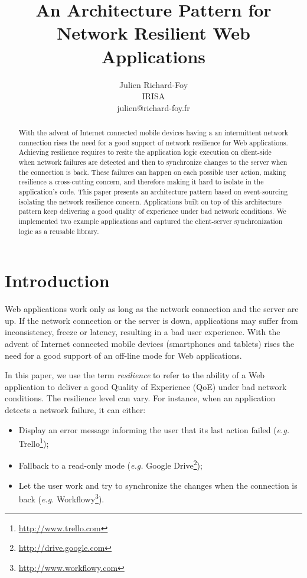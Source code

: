 \documentclass{article}
\begin{document}
\title{An Architecture Pattern for Network Resilient Web Applications}

\author{Julien Richard-Foy\\IRISA\\julien@richard-foy.fr}

\maketitle

\begin{abstract}
With the advent of Internet connected mobile devices having a an intermittent network connection rises the need for a good support of network resilience for Web applications. Achieving resilience requires to resite the application logic execution on client-side when network failures are detected and then to synchronize changes to the server when the connection is back. These failures can happen on each possible user action, making resilience a cross-cutting concern, and therefore making it hard to isolate in the application's code. This paper presents an architecture pattern based on event-sourcing isolating the network resilience concern. Applications built on top of this architecture pattern keep delivering a good quality of experience under bad network conditions. We implemented two example applications and captured the client-server synchronization logic as a reusable library.
\end{abstract}

\section{Introduction}

Web applications work only as long as the network connection and the server are up. If the network connection or the server is down, applications may suffer from inconsistency, freeze or latency, resulting in a bad user experience. With the advent of Internet connected mobile devices (smartphones and tablets) rises the need for a good support of an off-line mode for Web applications.

In this paper, we use the term \textit{resilience} to refer to the ability of a Web application to deliver a good Quality of Experience (QoE) under bad network conditions. The resilience level can vary. For instance, when an application detects a network failure, it can either:

\begin{itemize}
 \item Display an error message informing the user that its last action failed (\textit{e.g.} Trello\footnote{\href{http://www.trello.com}{http://www.trello.com}});
 \item Fallback to a read-only mode (\textit{e.g.} Google Drive\footnote{\href{http://drive.google.com}{http://drive.google.com}});
 \item Let the user work and try to synchronize the changes when the connection is back (\textit{e.g.} Workflowy\footnote{\href{http://www.workflowy.com}{http://www.workflowy.com}}).
\end{itemize}
\end{document}
